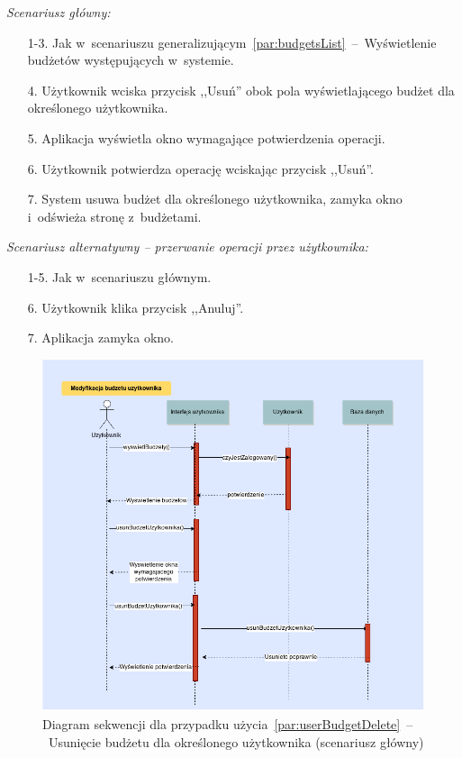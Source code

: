 \noindent \textit{Scenariusz główny:}
\begin{enumerate}
  \item[1-3.] Jak w~scenariuszu generalizującym~\ref{par:budgetsList}~--~Wyświetlenie budżetów występujących w~systemie.
  \item[4.] Użytkownik wciska przycisk ,,Usuń'' obok pola wyświetlającego budżet dla określonego użytkownika.
  \item[5.] Aplikacja wyświetla okno wymagające potwierdzenia operacji.
  \item[6.] Użytkownik potwierdza operację wciskając przycisk ,,Usuń''.
  \item[7.] System usuwa budżet dla określonego użytkownika, zamyka okno i~odświeża stronę z~budżetami.
\end{enumerate}

\noindent \textit{Scenariusz alternatywny -- przerwanie operacji przez użytkownika:}
\begin{enumerate}
  \item[1-5.] Jak w~scenariuszu głównym.
  \item[6.] Użytkownik klika przycisk ,,Anuluj''.
  \item[7.] Aplikacja zamyka okno.
\end{enumerate}

\begin{figure}[H]
  \includegraphics[width=\textwidth]{images/usun_budzet_uzytkownika.png}
  \caption{Diagram sekwencji dla przypadku użycia~\ref{par:userBudgetDelete}~--~Usunięcie budżetu dla określonego użytkownika (scenariusz główny)}
\end{figure}

